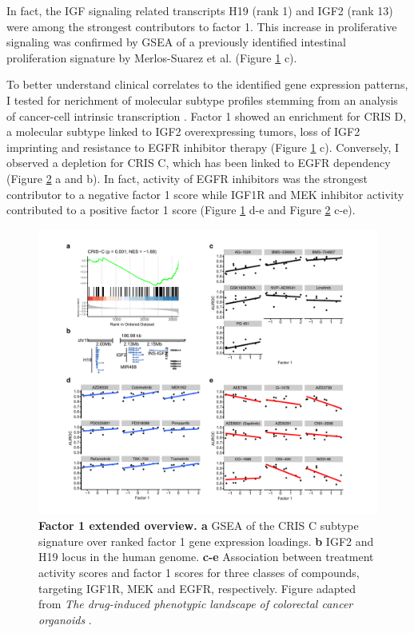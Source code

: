 \begin{flushleft}
\begin{figure}[h!]
\label{fig_261}
\end{figure}
\bigbreak

In fact, the IGF signaling related transcripts H19 (rank 1) and IGF2 (rank 13) were among the strongest contributors to factor 1. This increase in proliferative signaling was confirmed by GSEA of a previously identified intestinal proliferation signature by Merlos-Suarez et al. \cite{Merlos-Suarez2011-gd} (Figure \ref{fig_261} c). 

\bigbreak
To better understand clinical correlates to the identified gene expression patterns, I tested for nerichment of molecular subtype profiles stemming from an analysis of cancer-cell intrinsic transcription \cite{Isella2017-bm}. Factor 1 showed an enrichment for CRIS D, a molecular subtype linked to IGF2 overexpressing tumors, loss of IGF2 imprinting and resistance to EGFR inhibitor therapy (Figure \ref{fig_261} c). Conversely, I observed a depletion for CRIS C, which has been linked to EGFR dependency (Figure \ref{fig_262} a and b). In fact, activity of EGFR inhibitors was the strongest contributor to a negative factor 1 score while IGF1R and MEK inhibitor activity contributed to a positive factor 1 score (Figure \ref{fig_261} d-e and Figure \ref{fig_262} c-e).

\begin{figure}[h!]
\centering
\includegraphics[width=\textwidth,
                height=\textheight,
                keepaspectratio]{figures/promise/pdf/fig_6_2.pdf}
\caption{\textbf{Factor 1 extended overview. a} GSEA of the CRIS C subtype signature over ranked factor 1 gene expression loadings. \textbf{b} IGF2 and H19 locus in the human genome. \textbf{c-e} Association between treatment activity scores and factor 1 scores for three classes of compounds, targeting IGF1R, MEK and EGFR, respectively. Figure adapted from \textit{The drug-induced phenotypic landscape of colorectal cancer organoids} \cite{Betge2022-kr}.}
\label{fig_262}
\end{figure}


\end{flushleft}
